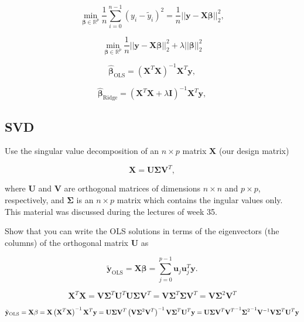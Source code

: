 \documentclass[twoside,11pt]{report}
\begin{document}
$$
{\displaystyle \min_{\mathbf{\beta}\in
{\mathbb{R}}^{p}}}\frac{1}{n}\sum_{i=0}^{n-1}\left(y_i-\tilde{y}_i\right)^2=\frac{1}{n}\vert\vert \mathbf{y}-\mathbf{X}\mathbf{\beta}\vert\vert_2^2,
$$




$$
{\displaystyle \min_{\mathbf{\beta}\in
{\mathbb{R}}^{p}}}\frac{1}{n}\vert\vert \mathbf{y}-\mathbf{X}\mathbf{\beta}\vert\vert_2^2+\lambda\vert\vert \mathbf{\beta}\vert\vert_2^2
$$




$$
\hat{\mathbf{\beta}}_{\mathrm{OLS}} = \left(\mathbf{X}^T\mathbf{X}\right)^{-1}\mathbf{X}^T\mathbf{y},
$$




$$
\hat{\mathbf{\beta}}_{\mathrm{Ridge}} = \left(\mathbf{X}^T\mathbf{X}+\lambda\mathbf{I}\right)^{-1}\mathbf{X}^T\mathbf{y},
$$





%
\subsection*{SVD}
\label{app:svd}



Use the singular value decomposition of an $n\times p$ matrix $\mathbf{X}$ (our design matrix)

$$
\mathbf{X}=\mathbf{U}\mathbf{\Sigma}\mathbf{V}^T,
$$


where $\mathbf{U}$ and $\mathbf{V}$ are orthogonal matrices of dimensions
$n\times n$ and $p\times p$, respectively, and $\mathbf{\Sigma}$ is an
$n\times p$ matrix which contains the ingular values only. This material was discussed during the lectures of week 35.

Show that you can write the 
OLS solutions in terms of the eigenvectors (the columns) of the orthogonal matrix  $\mathbf{U}$ as


$$
\tilde{\mathbf{y}}_{\mathrm{OLS}}=\mathbf{X}\mathbf{\beta}  = \sum_{j=0}^{p-1}\mathbf{u}_j\mathbf{u}_j^T\mathbf{y}.
$$


$$
\mathbf{X}^T\mathbf{X} = \mathbf{V}\mathbf{\Sigma}^T\mathbf{U}^T\mathbf{U}\mathbf{\Sigma}\mathbf{V}^T = \mathbf{V}\mathbf{\Sigma}^T\mathbf{\Sigma}\mathbf{V}^T = \mathbf{V}\mathbf{\Sigma}^2\mathbf{V}^T
$$

$$
\tilde{\mathbf{y}}_{\mathrm{OLS}} = \mathbf{X}\mathbf{\beta} = \mathbf{X} \left(\mathbf{X}^T \mathbf{X}\right)^{-1} \mathbf{X}^T \mathbf{y}
\\ = \mathbf{U}\mathbf{\Sigma}\mathbf{V}^T \left( \mathbf{V}\mathbf{\Sigma}^2\mathbf{V}^T \right)^{-1} \mathbf{V}\mathbf{\Sigma}^T\mathbf{U}^T \mathbf{y}
\\ = \mathbf{U}\mathbf{\Sigma}\mathbf{V}^T {\mathbf{V}^T}^{-1} {\mathbf{\Sigma}^2}^{-1} \mathbf{V}^{-1}  \mathbf{V}\mathbf{\Sigma}^T\mathbf{U}^T \mathbf{y}
$$
\end{document}
